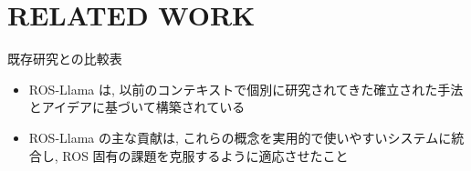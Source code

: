 
\section{RELATED WORK}
\label{sec: related work}

\begin{frame}{既存研究との比較表}
    \begin{itemize}
        \item ROS-Llama は, 以前のコンテキストで個別に研究されてきた確立された手法とアイデアに基づいて構築されている
        \item ROS-Llama の主な貢献は, これらの概念を実用的で使いやすいシステムに統合し, ROS 固有の課題を克服するように適応させたこと
    \end{itemize}
    \vspace{-5mm}
        \begin{table}[tb]
        \end{table}
\end{frame}


